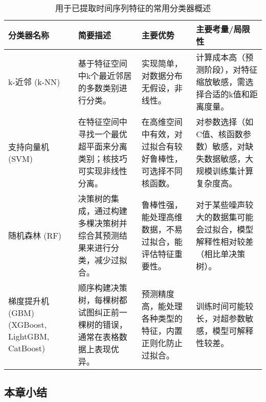 \begin{table}[h!]
    \centering
    \caption{用于已提取时间序列特征的常用分类器概述}
    \label{tab:classifiers_condensed}
    \begin{tabular}{|p{2cm}|p{3.5cm}|p{4cm}|p{4.5cm}|}
        \hline
        \textbf{分类器名称}                            & \textbf{简要描述}                         & \textbf{主要优势}                 & \textbf{主要考量/局限性}                        \\
        \hline
        k-近邻 (k-NN)                               & 基于特征空间中k个最近邻居的多数类别进行分类。               & 实现简单，对数据分布无假设，非线性。            & 计算成本高（预测阶段），对特征缩放敏感，需选择合适的k值和距离度量。       \\
        \hline
        支持向量机 (SVM)                               & 在特征空间中寻找一个最优超平面来分离类别；核技巧可实现非线性分离。     & 在高维空间中有效，对过拟合有较好鲁棒性，可选择不同核函数。 & 对参数选择（如C值、核函数参数）敏感，对缺失数据敏感，大规模训练集计算复杂度高。 \\
        \hline
        随机森林 (RF)                                 & 决策树的集成，通过构建多棵决策树并综合其预测结果来进行分类，减少过拟合。  & 鲁棒性强，能处理高维数据，不易过拟合，能评估特征重要性。  & 对于某些噪声较大的数据集可能会过拟合，模型解释性相对较差（相比单决策树）。    \\
        \hline
        梯度提升机 (GBM) (XGBoost, LightGBM, CatBoost) & 顺序构建决策树，每棵树都试图纠正前一棵树的错误，通常在表格数据上表现优异。 & 预测精度高，能处理各种类型的特征，内置正则化防止过拟合。  & 训练时间可能较长，对超参数敏感，模型可解释性较差。                \\
        \hline
    \end{tabular}
\end{table}





















\subsection{本章小结}
\label{sec:ch4_summary}
